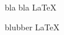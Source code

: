 \documentclass{article}
\begin{document}
\begin{example}
  bla bla \LaTeX
\end{example}

\bigskip

\begin{code}[]
  blubber \LaTeX
\end{code}
\end{document}
